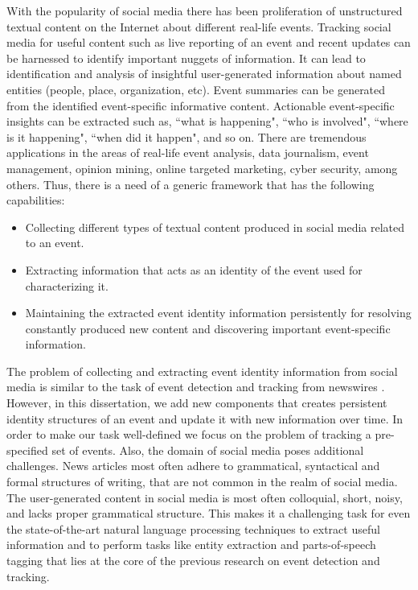 \indent With the popularity of social media there has been proliferation of unstructured textual content on the Internet about different real-life events. Tracking social media for useful content such as live reporting of an event and recent updates can be harnessed to identify important nuggets of information. It can lead to identification and analysis of insightful user-generated information about named entities (people, place, organization, etc). Event summaries can be generated from the identified event-specific informative content. Actionable event-specific insights can be extracted such as, ``what is happening", ``who is involved", ``where is it happening", ``when did it happen", and so on. There are tremendous applications in the areas of real-life event analysis, data journalism, event management, opinion mining, online targeted marketing, cyber security, among others. Thus, there is a need of a generic framework that has the following capabilities:
\begin{itemize}
\item Collecting different types of textual content produced in social media related to an event.
\item Extracting information that acts as an identity of the event used for characterizing it.
\item Maintaining the extracted event identity information persistently for resolving constantly produced new content and discovering important event-specific information. 
\end{itemize}


\indent The problem of collecting and extracting event identity information from social media is similar to the task of event detection and tracking from newswires \cite{allan1998line,kumaran2004text}. However, in this dissertation, we add new components that creates persistent identity structures of an event and update it with new information over time. In order to make our task well-defined we focus on the problem of tracking a pre-specified set of events. Also, the domain of social media poses additional challenges. News articles most often adhere to grammatical, syntactical and formal structures of writing, that are not common in the realm of social media. The user-generated content in social media is most often colloquial, short, noisy, and lacks proper grammatical structure. This makes it a challenging task for even the state-of-the-art natural language processing techniques to extract useful information and to perform tasks like entity extraction and parts-of-speech tagging that lies at the core of the previous research on event detection and tracking.

